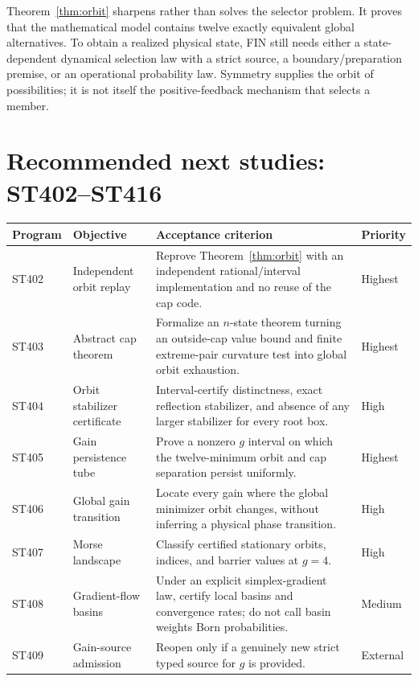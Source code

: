 \documentclass[11pt,a4paper]{article}
\begin{document}
Theorem~\ref{thm:orbit} sharpens rather than solves the selector problem.  It proves
that the mathematical model contains twelve exactly equivalent global alternatives.
To obtain a realized physical state, FIN still needs either a state-dependent dynamical
selection law with a strict source, a boundary/preparation premise, or an operational
probability law.  Symmetry supplies the orbit of possibilities; it is not itself the
positive-feedback mechanism that selects a member.

\section{Recommended next studies: ST402--ST416}

\begin{longtable}{>{\raggedright\arraybackslash}p{}>{\raggedright\arraybackslash}p{}>{\raggedright\arraybackslash}p{}>{\raggedright\arraybackslash}p{}}
\toprule Program&Objective&Acceptance criterion&Priority\\\midrule\endhead
ST402&Independent orbit replay&Reprove Theorem~\ref{thm:orbit} with an independent rational/interval implementation and no reuse of the cap code.&Highest\\
ST403&Abstract cap theorem&Formalize an $n$-state theorem turning an outside-cap value bound and finite extreme-pair curvature test into global orbit exhaustion.&Highest\\
ST404&Orbit stabilizer certificate&Interval-certify distinctness, exact reflection stabilizer, and absence of any larger stabilizer for every root box.&High\\
ST405&Gain persistence tube&Prove a nonzero $g$ interval on which the twelve-minimum orbit and cap separation persist uniformly.&Highest\\
ST406&Global gain transition&Locate every gain where the global minimizer orbit changes, without inferring a physical phase transition.&High\\
ST407&Morse landscape&Classify certified stationary orbits, indices, and barrier values at $g=4$.&High\\
ST408&Gradient-flow basins&Under an explicit simplex-gradient law, certify local basins and convergence rates; do not call basin weights Born probabilities.&Medium\\
ST409&Gain-source admission&Reopen only if a genuinely new strict typed source for $g$ is provided.&External\\

\end{longtable}
\end{document}
